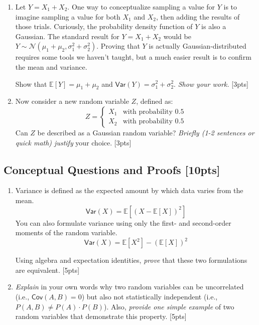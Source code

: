 \begin{enumerate}[label=\alph*.]
    \item Let $Y = X_1 + X_2$. One way to conceptualize sampling a value for $Y$ is to imagine sampling a value for both $X_1$ and $X_2$, then adding the results of those trials. Curiously, the probability density function of $Y$ is also a Gaussian. The standard result for $Y = X_1 + X_2$ would be $Y \sim \mathcal{N}(\mu_1 + \mu_2, \sigma_1^2 + \sigma_2^2)$. Proving that $Y$ is actually Gaussian-distributed requires some tools we haven't taught, but a much easier result is to confirm the mean and variance.

    Show that $\mathbb{E}[Y]=\mu_1 + \mu_2$ and $\mathsf{Var}(Y)=\sigma_1^2 + \sigma_2^2$. \emph{Show your work.} [3pts]

    \item Now consider a new random variable $Z$, defined as:
    $$Z = \begin{cases}
        X_1 & \text{with probability } 0.5 \\
        X_2 & \text{with probability } 0.5
    \end{cases}$$
    Can $Z$ be described as a Gaussian random variable? \emph{Briefly (1-2 sentences or quick math) justify} your choice. [3pts]

\end{enumerate}
\newpage



\subsection{Conceptual Questions and Proofs [10pts]}
\begin{enumerate}[label=\alph*.]
    \item Variance is defined as the expected amount by which data varies from the mean.
    $$\mathsf{Var}(X) = \mathbb{E}[(X-\mathbb{E}[X])^2]$$
    You can also formulate variance using only the first- and second-order moments of the random variable.
    $$\mathsf{Var}(X) = \mathbb{E}[X^2] - (\mathbb{E}[X])^2$$

    Using algebra and expectation identities, \emph{prove} that these two formulations are equivalent. [5pts]

    \item \emph{Explain} in your own words why two random variables can be uncorrelated (i.e., $\mathsf{Cov}(A, B)=0$) but also not statistically independent (i.e., $P(A,B)\neq P(A)\cdot P(B)$).
    Also, \emph{provide one simple example} of two random variables that demonstrate this property. [5pts]
\end{enumerate}
\newpage
